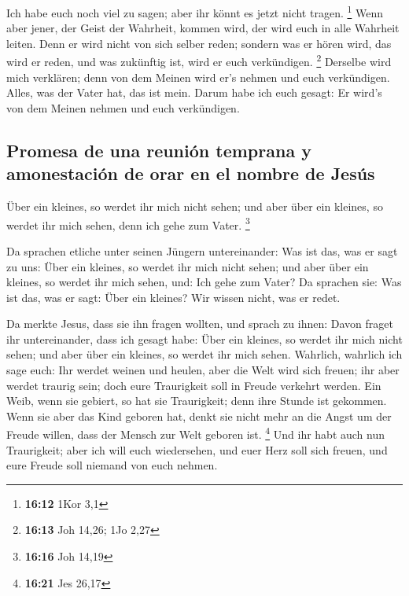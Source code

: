  Ich habe euch noch viel zu sagen; aber ihr könnt es
jetzt nicht tragen. \footnote{\textbf{16:12} 1Kor 3,1} 
Wenn aber jener, der Geist der Wahrheit, kommen wird, der wird euch in
alle Wahrheit leiten. Denn er wird nicht von sich selber reden; sondern
was er hören wird, das wird er reden, und was zukünftig ist, wird er
euch verkündigen. \footnote{\textbf{16:13} Joh 14,26; 1Jo 2,27}
 Derselbe wird mich verklären; denn von dem Meinen wird
er's nehmen und euch verkündigen.  Alles, was der Vater
hat, das ist mein. Darum habe ich euch gesagt: Er wird's von dem Meinen
nehmen und euch verkündigen.

\hypertarget{promesa-de-una-reuniuxf3n-temprana-y-amonestaciuxf3n-de-orar-en-el-nombre-de-jesuxfas}{%
\subsection{Promesa de una reunión temprana y amonestación de orar en el
nombre de
Jesús}\label{promesa-de-una-reuniuxf3n-temprana-y-amonestaciuxf3n-de-orar-en-el-nombre-de-jesuxfas}}

 Über ein kleines, so werdet ihr mich nicht sehen; und
aber über ein kleines, so werdet ihr mich sehen, denn ich gehe zum
Vater. \footnote{\textbf{16:16} Joh 14,19}

 Da sprachen etliche unter seinen Jüngern untereinander:
Was ist das, was er sagt zu uns: Über ein kleines, so werdet ihr mich
nicht sehen; und aber über ein kleines, so werdet ihr mich sehen, und:
Ich gehe zum Vater?  Da sprachen sie: Was ist das, was er
sagt: Über ein kleines? Wir wissen nicht, was er redet.

 Da merkte Jesus, dass sie ihn fragen wollten, und sprach
zu ihnen: Davon fraget ihr untereinander, dass ich gesagt habe: Über ein
kleines, so werdet ihr mich nicht sehen; und aber über ein kleines, so
werdet ihr mich sehen.  Wahrlich, wahrlich ich sage euch:
Ihr werdet weinen und heulen, aber die Welt wird sich freuen; ihr aber
werdet traurig sein; doch eure Traurigkeit soll in Freude verkehrt
werden.  Ein Weib, wenn sie gebiert, so hat sie
Traurigkeit; denn ihre Stunde ist gekommen. Wenn sie aber das Kind
geboren hat, denkt sie nicht mehr an die Angst um der Freude willen,
dass der Mensch zur Welt geboren ist. \footnote{\textbf{16:21} Jes 26,17}
 Und ihr habt auch nun Traurigkeit; aber ich will euch
wiedersehen, und euer Herz soll sich freuen, und eure Freude soll
niemand von euch nehmen.

